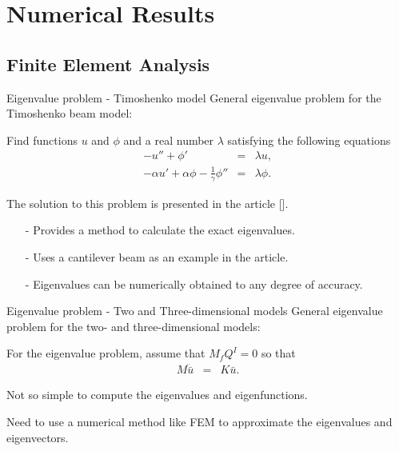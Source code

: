 \documentclass[8pt]{beamer}
\begin{document}
\section{Numerical Results}
    \subsection{Finite Element Analysis}
        \begin{frame}{Eigenvalue problem - Timoshenko model}
            General eigenvalue problem for the Timoshenko beam model:
        
            Find functions $u$ and $\phi$ and a real number $\lambda$ satisfying the following equations
            \begin{eqnarray}
            -u'' + \phi' &=& \lambda u, \label{eq:Timo:EigenvalueProblem1}\\
            -\alpha u' + \alpha\phi - \frac{1}{\gamma}\phi'' &=& \lambda\phi.\label{eq:Timo:EigenvalueProblem2}
            \end{eqnarray}
        
            The solution to this problem is presented in the article [\cite{VV06}].
        
            \begin{itemize}
                \item[-] Provides a method to calculate the exact eigenvalues.
                \item[-] Uses a cantilever beam as an example in the article.
                \item[-] Eigenvalues can be numerically obtained to any degree of accuracy.
            \end{itemize}
        
        \end{frame}

        \begin{frame}{Eigenvalue problem - Two and Three-dimensional models}
            General eigenvalue problem for the two- and three-dimensional models:
            
                For the eigenvalue problem, assume that $M_{f}Q^I = 0$ so that 
            \begin{eqnarray}
                    M\ddot{\bar{u}} & = & K\bar{u}.\label{eq:2DFEM:M2}
            \end{eqnarray}
            
            Not so simple to compute the eigenvalues and eigenfunctions.
            
            Need to use a numerical method like FEM to approximate the eigenvalues and eigenvectors.
        
        \end{frame}
\end{document}
